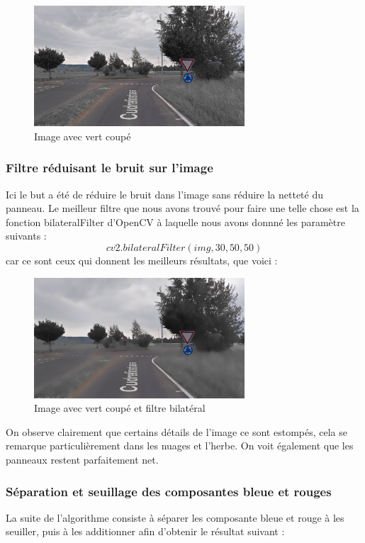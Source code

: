 \documentclass[a4paper,10pt,openany,oneside]{report}
\begin{document}
\begin{figure}[!h]
\centering
\includegraphics[width=0.7\textwidth]{../img/81-cut.png}
\caption{Image avec vert coupé}
\end{figure}

\subsubsection{Filtre réduisant le bruit sur l'image}
Ici le but a été de réduire le bruit dans l'image sans réduire la netteté du panneau. Le meilleur filtre que nous avons trouvé pour faire une telle chose est la fonction bilateralFilter d'OpenCV à laquelle nous avons donnné les paramètre suivants :
\[ cv2.bilateralFilter(img,30,50,50) \]
car ce sont ceux qui donnent les meilleurs résultats, que voici :

\begin{figure}[!h]
\centering
\includegraphics[width=0.7\textwidth]{../img/82-bilblur.png}
\caption{Image avec vert coupé et filtre bilatéral}
\end{figure}

On observe clairement que certains détails de l'image ce sont estompés, cela se remarque particulièrement dans les nuages et l'herbe. On voit également que les panneaux restent parfaitement net.

\subsubsection{Séparation et seuillage des composantes bleue et rouges}
La suite de l'algorithme consiste à séparer les composante bleue et rouge à les seuiller, puis à les additionner afin d'obtenir le résultat suivant :
\end{document}
